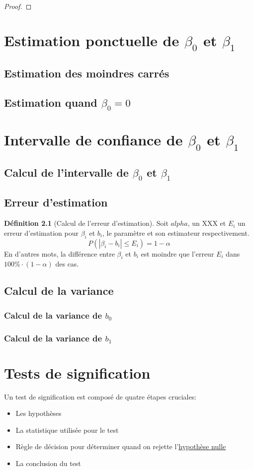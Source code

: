 \documentclass[12pt]{book}
\newcommand\todo[1]{\phantom{#1}}
\theoremstyle{definition}
\newtheorem{definition}{Définition}[section]
\begin{document}
\begin{proof}
    
\end{proof}
\chapter{Estimation ponctuelle de $\beta_0$ et $\beta_1$}

\section{Estimation des moindres carrés}
\section{Estimation quand $\beta_0 = 0$}
\chapter{Intervalle de confiance de $\beta_0$ et $\beta_1$}
\section{Calcul de l'intervalle de $\beta_0$ et $\beta_1$}
\section{Erreur d'estimation}
\begin{definition}[Calcul de l'erreur d'estimation]
    \label{def:calcul_erreur_estimation}
    Soit $alpha$, un XXX \todo{Add name + link} et $E_i$ un erreur d'estimation 
    \todo{Add link} pour $\beta_i$ et $b_i$, le paramètre et son estimateur respectivement.
    $$ P(|\beta_i - b_i| \leq E_i) = 1 - \alpha $$
    En d'autres mots, la différence entre $\beta_i$ et $b_i$ est moindre que l'erreur $E_i$ dans
    $100\% \cdot (1 - \alpha)$ des cas.
\end{definition}
\section{Calcul de la variance}
\subsection{Calcul de la variance de $b_0$}
\subsection{Calcul de la variance de $b_1$}
\chapter{Tests de signification}
Un test de signification est composé de quatre étapes cruciales:
\begin{itemize}
    \item Les hypothèses
    \item La statistique utilisée pour le test
    \item Règle de décision pour déterminer quand on rejette l'\hyperref[def:hypothese_nulle]{hypothèse nulle}
    \item La conclusion du test
\end{itemize}
\end{document}
